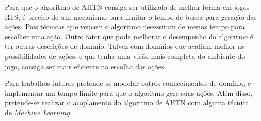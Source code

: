 Para que o algoritmo de AHTN consiga ser utilizado de melhor forma em jogos RTS, é preciso de um mecanismo para limitar o tempo de busca para geração das ações.
Pois técnicas que vencem o algoritmo necessitam de menos tempo para escolher uma ação.
Outro fator que pode melhorar o desempenho do algoritmo é ter outras descrições de domínio.
Talvez com domínios que avaliam melhor as possibilidades de ações, e que tenha uma visão mais completa do ambiente do jogo, consiga ser mais eficiente na escolha das ações. 

Para trabalhos futuros pretende-se modelar outros conhecimentos de domínio, e implementar um tempo limite para que o algoritmo gere suas ações. 
Além disso, pretende-se realizar o acoplamento do algoritmo de AHTN com alguma técnica de \textit{Machine Learning}. 
